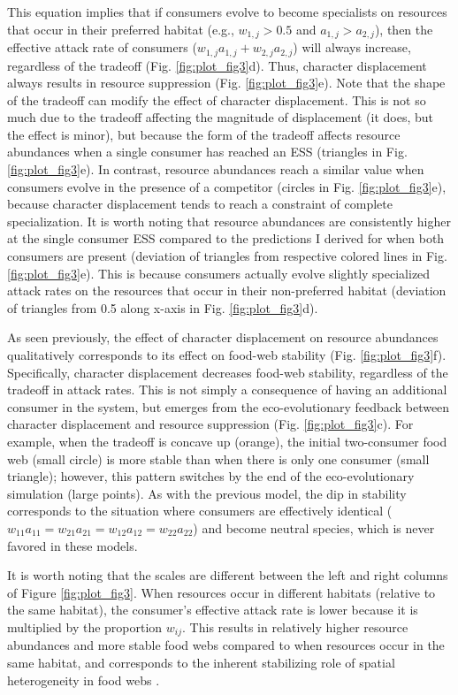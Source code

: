 \documentclass[11pt,]{article}
\begin{document}
This equation implies that if consumers evolve to become specialists on
resources that occur in their preferred habitat (e.g., \(w_{1,j}>0.5\)
and \(a_{1,j}>a_{2,j}\)), then the effective attack rate of consumers
(\(w_{1,j}a_{1,j}+w_{2,j}a_{2,j}\)) will always increase, regardless of
the tradeoff (Fig. \ref{fig:plot_fig3}d). Thus, character displacement
always results in resource suppression (Fig. \ref{fig:plot_fig3}e). Note
that the shape of the tradeoff can modify the effect of character
displacement. This is not so much due to the tradeoff affecting the
magnitude of displacement (it does, but the effect is minor), but
because the form of the tradeoff affects resource abundances when a
single consumer has reached an ESS (triangles in Fig.
\ref{fig:plot_fig3}e). In contrast, resource abundances reach a similar
value when consumers evolve in the presence of a competitor (circles in
Fig. \ref{fig:plot_fig3}e), because character displacement tends to
reach a constraint of complete specialization. It is worth noting that
resource abundances are consistently higher at the single consumer ESS
compared to the predictions I derived for when both consumers are
present (deviation of triangles from respective colored lines in Fig.
\ref{fig:plot_fig3}e). This is because consumers actually evolve
slightly specialized attack rates on the resources that occur in their
non-preferred habitat (deviation of triangles from 0.5 along x-axis in
Fig. \ref{fig:plot_fig3}d).

As seen previously, the effect of character displacement on resource
abundances qualitatively corresponds to its effect on food-web stability
(Fig. \ref{fig:plot_fig3}f). Specifically, character displacement
decreases food-web stability, regardless of the tradeoff in attack
rates. This is not simply a consequence of having an additional consumer
in the system, but emerges from the eco-evolutionary feedback between
character displacement and resource suppression (Fig.
\ref{fig:plot_fig3}c). For example, when the tradeoff is concave up
(orange), the initial two-consumer food web (small circle) is more
stable than when there is only one consumer (small triangle); however,
this pattern switches by the end of the eco-evolutionary simulation
(large points). As with the previous model, the dip in stability
corresponds to the situation where consumers are effectively identical
(\(w_{11}a_{11}=w_{21}a_{21}=w_{12}a_{12}=w_{22}a_{22}\)) and become
neutral species, which is never favored in these models.

It is worth noting that the scales are different between the left and
right columns of Figure \ref{fig:plot_fig3}. When resources occur in
different habitats (relative to the same habitat), the consumer's
effective attack rate is lower because it is multiplied by the
proportion \(w_{ij}\). This results in relatively higher resource
abundances and more stable food webs compared to when resources occur in
the same habitat, and corresponds to the inherent stabilizing role of
spatial heterogeneity in food webs \citep{Holt1984, McCann2005}.
\end{document}
